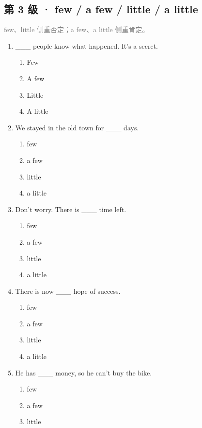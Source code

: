 \documentclass[11pt,a4paper]{ctexart}
\begin{document}
\subsection*{第 3 级 · few / a few / little / a little}
\noindent\textcolor{gray}{few、little 侧重否定；a few、a little 侧重肯定。}\par\smallskip
\begin{enumerate}[leftmargin=*,itemsep=4pt]
\item \_\_\_ people know what happened. It’s a secret.
\begin{enumerate}[label=\Alph*.,leftmargin=2em,itemsep=1pt,topsep=2pt]
\item Few
\item A few
\item Little
\item A little
\end{enumerate}
\item We stayed in the old town for \_\_\_ days.
\begin{enumerate}[label=\Alph*.,leftmargin=2em,itemsep=1pt,topsep=2pt]
\item few
\item a few
\item little
\item a little
\end{enumerate}
\item Don’t worry. There is \_\_\_ time left.
\begin{enumerate}[label=\Alph*.,leftmargin=2em,itemsep=1pt,topsep=2pt]
\item few
\item a few
\item little
\item a little
\end{enumerate}
\item There is now \_\_\_ hope of success.
\begin{enumerate}[label=\Alph*.,leftmargin=2em,itemsep=1pt,topsep=2pt]
\item few
\item a few
\item little
\item a little
\end{enumerate}
\item He has \_\_\_ money, so he can’t buy the bike.
\begin{enumerate}[label=\Alph*.,leftmargin=2em,itemsep=1pt,topsep=2pt]
\item few
\item a few
\item little

\end{enumerate}
\end{enumerate}
\end{document}
